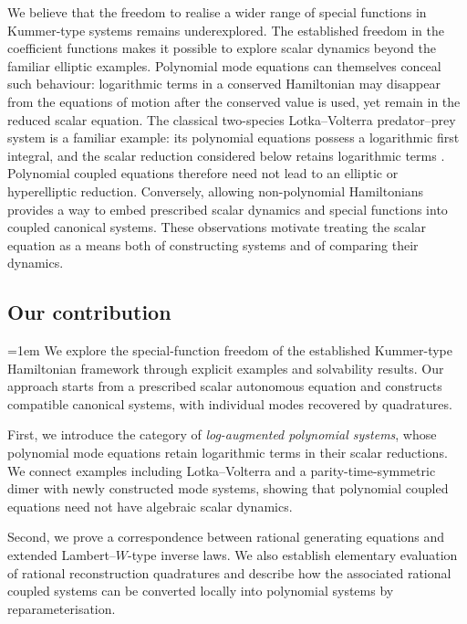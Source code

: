 \documentclass[11pt,a4paper]{article}
\numberwithin{equation}{section}
\begin{document}
We believe that the freedom to realise a wider range of special functions in Kummer-type systems remains underexplored. The established freedom in the coefficient functions makes it possible to explore scalar dynamics beyond the familiar elliptic examples. Polynomial mode equations can themselves conceal such behaviour: logarithmic terms in a conserved Hamiltonian may disappear from the equations of motion after the conserved value is used, yet remain in the reduced scalar equation. The classical two-species Lotka--Volterra predator--prey system is a familiar example: its polynomial equations possess a logarithmic first integral, and the scalar reduction considered below retains logarithmic terms \cite{baigentLotkaVolterraDynamicsIntroduction}. Polynomial coupled equations therefore need not lead to an elliptic or hyperelliptic reduction. Conversely, allowing non-polynomial Hamiltonians provides a way to embed prescribed scalar dynamics and special functions into coupled canonical systems. These observations motivate treating the scalar equation as a means both of constructing systems and of comparing their dynamics.

\subsection{Our contribution}
\label{sec:our-contribution}

{\emergencystretch=1em
We explore the special-function freedom of the established Kummer-type Hamiltonian framework through explicit examples and solvability results. Our approach starts from a prescribed scalar autonomous equation and constructs compatible canonical systems, with individual modes recovered by quadratures.\par}

First, we introduce the category of \emph{log-augmented polynomial systems}, whose polynomial mode equations retain logarithmic terms in their scalar reductions. We connect examples including Lotka--Volterra and a parity-time-symmetric dimer with newly constructed mode systems, showing that polynomial coupled equations need not have algebraic scalar dynamics.

Second, we prove a correspondence between rational generating equations and extended Lambert--$W$-type inverse laws. We also establish elementary evaluation of rational reconstruction quadratures and describe how the associated rational coupled systems can be converted locally into polynomial systems by reparameterisation.
\end{document}
